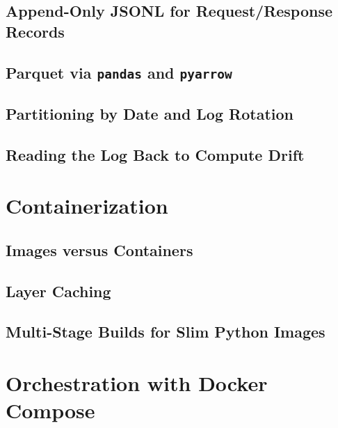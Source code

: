 \subsection{Append-Only JSONL for Request/Response Records}

\subsection{Parquet via \texttt{pandas} and \texttt{pyarrow}}

\subsection{Partitioning by Date and Log Rotation}

\subsection{Reading the Log Back to Compute Drift}


\section{Containerization}
\label{sec:docker}

\subsection{Images versus Containers}

\subsection{Layer Caching}

\subsection{Multi-Stage Builds for Slim Python Images}

\section{Orchestration with Docker Compose}
\label{sec:docker-compose}

